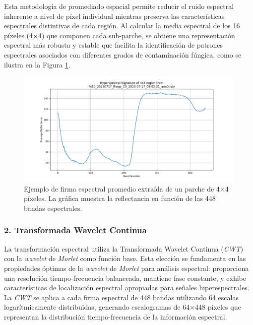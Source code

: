 Esta metodología de promediado espacial permite reducir el ruido espectral inherente a nivel de píxel individual mientras preserva las características espectrales distintivas de cada región. Al calcular la media espectral de los 16 píxeles (4×4) que componen cada sub-parche, se obtiene una representación espectral más robusta y estable que facilita la identificación de patrones espectrales asociados con diferentes grados de contaminación fúngica, como se ilustra en la Figura \ref{fig:hyperspectral_signature_example}.

\begin{figure}[ht]
\centering
\includegraphics[width=\textwidth]{images/hyperspectral_signature.png}
\caption{Ejemplo de firma espectral promedio extraída de un parche de 4×4 píxeles. La gráfica muestra la reflectancia en función de las 448 bandas espectrales.}
\label{fig:hyperspectral_signature_example}
\end{figure}

\subsubsection{2. Transformada Wavelet Continua}

La transformación espectral utiliza la Transformada Wavelet Continua (\emph{CWT}) con la \emph{wavelet} de \emph{Morlet} como función base. Esta elección se fundamenta en las propiedades óptimas de la \emph{wavelet} de \emph{Morlet} para análisis espectral: proporciona una resolución tiempo-frecuencia balanceada, mantiene fase constante, y exhibe características de localización espectral apropiadas para señales hiperespectrales. La \emph{CWT} se aplica a cada firma espectral de 448 bandas utilizando 64 escalas logarítmicamente distribuidas, generando escalogramas de 64×448 píxeles que representan la distribución tiempo-frecuencia de la información espectral.

